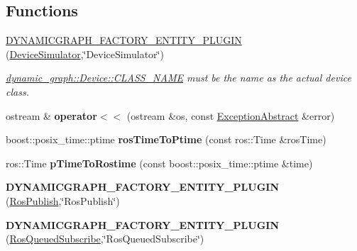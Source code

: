 \subsection*{Functions}
\begin{DoxyCompactItemize}
\item 
\hyperlink{namespacedynamic__graph_a04797aa55f04bd1e07b64c0caa685c6b}{D\+Y\+N\+A\+M\+I\+C\+G\+R\+A\+P\+H\+\_\+\+F\+A\+C\+T\+O\+R\+Y\+\_\+\+E\+N\+T\+I\+T\+Y\+\_\+\+P\+L\+U\+G\+IN} (\hyperlink{classdynamic__graph_1_1DeviceSimulator}{Device\+Simulator},\char`\"{}Device\+Simulator\char`\"{})\hypertarget{namespacedynamic__graph_a04797aa55f04bd1e07b64c0caa685c6b}{}\label{namespacedynamic__graph_a04797aa55f04bd1e07b64c0caa685c6b}

\begin{DoxyCompactList}\small\item\em \hyperlink{classdynamic__graph_1_1Device_ab1612928a8cf1a9133fb2571f99095b1}{dynamic\+\_\+graph\+::\+Device\+::\+C\+L\+A\+S\+S\+\_\+\+N\+A\+ME} must be the name as the actual device class. \end{DoxyCompactList}\item 
ostream \& {\bfseries operator$<$$<$} (ostream \&os, const \hyperlink{classdynamic__graph_1_1ExceptionAbstract}{Exception\+Abstract} \&error)\hypertarget{namespacedynamic__graph_a44046716acbcd14008a1672f9bb71594}{}\label{namespacedynamic__graph_a44046716acbcd14008a1672f9bb71594}

\item 
boost\+::posix\+\_\+time\+::ptime {\bfseries ros\+Time\+To\+Ptime} (const ros\+::\+Time \&ros\+Time)\hypertarget{namespacedynamic__graph_ae79d27ce6f0c5bc0788a4fb4bd33f363}{}\label{namespacedynamic__graph_ae79d27ce6f0c5bc0788a4fb4bd33f363}

\item 
ros\+::\+Time {\bfseries p\+Time\+To\+Rostime} (const boost\+::posix\+\_\+time\+::ptime \&time)\hypertarget{namespacedynamic__graph_a3d2b2b3f2e9363d80c0abb64c4408e66}{}\label{namespacedynamic__graph_a3d2b2b3f2e9363d80c0abb64c4408e66}

\item 
{\bfseries D\+Y\+N\+A\+M\+I\+C\+G\+R\+A\+P\+H\+\_\+\+F\+A\+C\+T\+O\+R\+Y\+\_\+\+E\+N\+T\+I\+T\+Y\+\_\+\+P\+L\+U\+G\+IN} (\hyperlink{classdynamic__graph_1_1RosPublish}{Ros\+Publish},\char`\"{}Ros\+Publish\char`\"{})\hypertarget{namespacedynamic__graph_aa27a921d00a72d96e222688e17c81712}{}\label{namespacedynamic__graph_aa27a921d00a72d96e222688e17c81712}

\item 
{\bfseries D\+Y\+N\+A\+M\+I\+C\+G\+R\+A\+P\+H\+\_\+\+F\+A\+C\+T\+O\+R\+Y\+\_\+\+E\+N\+T\+I\+T\+Y\+\_\+\+P\+L\+U\+G\+IN} (\hyperlink{classdynamic__graph_1_1RosQueuedSubscribe}{Ros\+Queued\+Subscribe},\char`\"{}Ros\+Queued\+Subscribe\char`\"{})\hypertarget{namespacedynamic__graph_a63028fef53791a488a923c19cc7e38d5}{}\label{namespacedynamic__graph_a63028fef53791a488a923c19cc7e38d5}


\end{DoxyCompactItemize}
